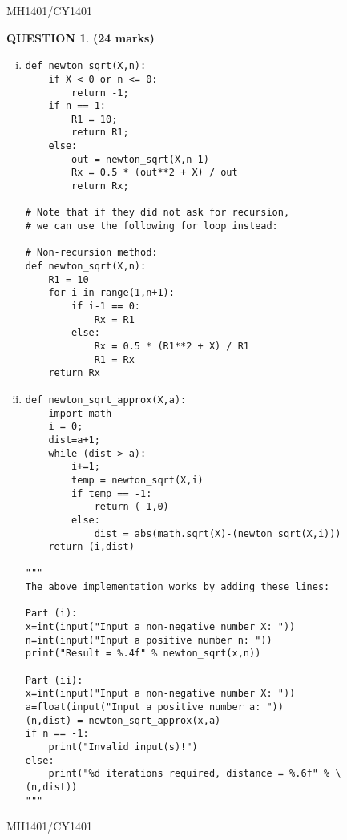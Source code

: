 \documentclass[a4paper,12pt]{article}
\theoremstyle{definition}
\newtheorem{ques}[dummy]{QUESTION}
\theoremstyle{plain}
\newcommand{\py}{python}
\begin{document}
\newpage
\hfill MH1401/CY1401\vspace*{0.5em}
\begin{ques}\hfill \textbf{(24 marks)}\vspace*{1em}
	\begin{enumerate}[(i)]
		\item
		\begin{verbatim}
def newton_sqrt(X,n):
    if X < 0 or n <= 0:
        return -1;
    if n == 1:
        R1 = 10;
        return R1;
    else:
        out = newton_sqrt(X,n-1)
        Rx = 0.5 * (out**2 + X) / out
        return Rx;		

# Note that if they did not ask for recursion,
# we can use the following for loop instead:

# Non-recursion method:
def newton_sqrt(X,n):
    R1 = 10
    for i in range(1,n+1):
        if i-1 == 0:
            Rx = R1
        else:
            Rx = 0.5 * (R1**2 + X) / R1
            R1 = Rx
    return Rx
\end{verbatim}
\item
		\begin{verbatim}
def newton_sqrt_approx(X,a):
    import math
    i = 0;
    dist=a+1;
    while (dist > a):
        i+=1;
        temp = newton_sqrt(X,i)
        if temp == -1:
            return (-1,0)
        else:
            dist = abs(math.sqrt(X)-(newton_sqrt(X,i)))
    return (i,dist)
    
"""
The above implementation works by adding these lines:

Part (i):
x=int(input("Input a non-negative number X: "))
n=int(input("Input a positive number n: "))
print("Result = %.4f" % newton_sqrt(x,n))

Part (ii):
x=int(input("Input a non-negative number X: "))
a=float(input("Input a positive number a: "))
(n,dist) = newton_sqrt_approx(x,a)
if n == -1:
    print("Invalid input(s)!")
else:
    print("%d iterations required, distance = %.6f" % \ 
(n,dist))
"""
		\end{verbatim}
	\end{enumerate}
\end{ques}



\newpage

\hfill MH1401/CY1401\vspace*{0.5em}
\end{document}
